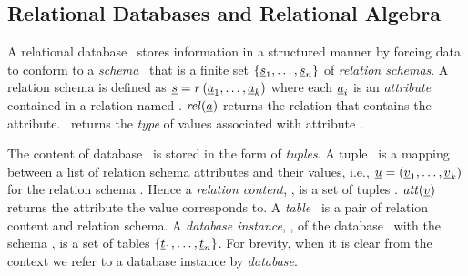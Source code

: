 \subsection{Relational Databases and Relational Algebra}
\label{sec:rel-db}

A relational database \pDB\ stores information in a structured manner by forcing
data to conform to a \emph{schema} \pSch\ that is a finite set 
$\setDef {{\pRelSch}_1, \ldots, {\pRelSch}_n}$ of \emph{relation schemas}.
A relation schema is defined as
$\pRelSch = \vRel \paran {\vi \pAtt k}$ where each $\pAtt_i$ is an
\emph{attribute} contained in a relation named \vRel. 
$\getRel {\pAtt}$ returns the relation that contains the attribute.
\type [\pAtt]\ returns the \emph{type} of values associated with attribute \pAtt.

The content of database \pDB\ is stored in the form of \emph{tuples}. A tuple \pTuple\
is a mapping between a list of relation schema attributes and their values,
i.e.,
$\pTuple = \paran {\vi {\underline v} k}$ for the relation schema \vRel {}.
Hence a \emph{relation content}, \pRelCont, is a set of tuples \setDef {\vi \pTuple m}.
$\getAtt {\underline v}$ returns the attribute the value corresponds to.
A \emph{table} \pTab\ is a pair of relation content and relation schema.
A \emph{database instance}, \pInst, of the database \pDB\ with the
schema \pSch, is a set of tables $\setDef {\pTab_1, \ldots, \pTab_n}$.
For brevity, when it is clear from the context we refer to a database instance
by \emph{database}.





